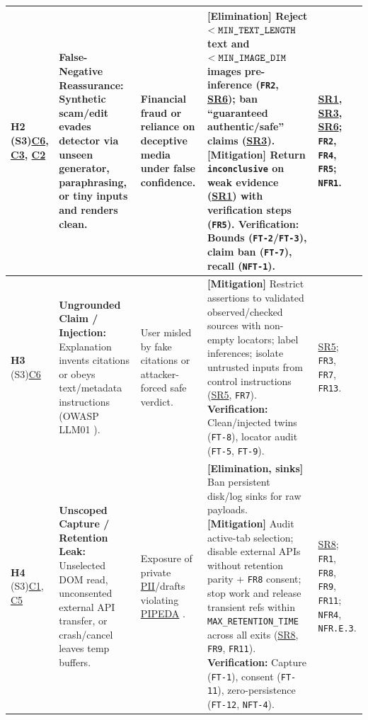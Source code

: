 \documentclass[11pt]{article}
\newcommand{\MaxRetentionTime}{\texttt{MAX\_\allowbreak{}RETENTION\_\allowbreak{}TIME}}
\newcommand{\MinTextLength}{\texttt{MIN\_\allowbreak{}TEXT\_\allowbreak{}LENGTH}}
\newcommand{\MinImageDim}{\texttt{MIN\_\allowbreak{}IMAGE\_\allowbreak{}DIM}}
\newcommand{\PII}{\hyperlink{ha-acr-pii}{PII}}
\newcommand{\PIPEDA}{\hyperlink{ha-acr-pipeda}{PIPEDA}}
\begin{document}
\begin{landscape}
\begin{tabularx}{\linewidth}{P{1.75cm} P{3.2cm} P{2.9cm} Y P{2.25cm}}
\label{haz:H2}\textbf{H2} (S3)\newline \hyperref[comp:C6]{C6}, \hyperref[comp:C3]{C3}, \hyperref[comp:C2]{C2} &
\textbf{False-Negative Reassurance:} Synthetic scam/edit evades detector via unseen generator, paraphrasing, or tiny inputs and renders clean. &
Financial fraud or reliance on deceptive media under false confidence. &
\textbf{[Elimination]} Reject $< \MinTextLength{}$ text and $< \MinImageDim{}$ images pre-inference (\texttt{FR2}, \hyperref[SR6]{SR6}); ban ``guaranteed authentic/safe'' claims (\hyperref[SR3]{SR3}).\newline
\textbf{[Mitigation]} Return \texttt{inconclusive} on weak evidence (\hyperref[SR1]{SR1}) with verification steps (\texttt{FR5}).\newline
\textbf{Verification:} Bounds (\texttt{FT-2}/\texttt{FT-3}), claim ban (\texttt{FT-7}), recall (\texttt{NFT-1}). &
\hyperref[SR1]{SR1}, \hyperref[SR3]{SR3}, \hyperref[SR6]{SR6}; \texttt{FR2}, \texttt{FR4}, \texttt{FR5}; \texttt{NFR1}.\\
\midrule

\label{haz:H3}\textbf{H3} (S3)\newline \hyperref[comp:C6]{C6} &
\textbf{Ungrounded Claim / Injection:} Explanation invents citations or obeys text/metadata instructions (OWASP LLM01 \cite{OWASPLLM}). &
User misled by fake citations or attacker-forced safe verdict. &
\textbf{[Mitigation]} Restrict assertions to validated observed/checked sources with non-empty locators; label inferences; isolate untrusted inputs from control instructions (\hyperref[SR5]{SR5}, \texttt{FR7}).\newline
\textbf{Verification:} Clean/injected twins (\texttt{FT-8}), locator audit (\texttt{FT-5}, \texttt{FT-9}). &
\hyperref[SR5]{SR5}; \texttt{FR3}, \texttt{FR7}, \texttt{FR13}.\\
\midrule

\label{haz:H4}\textbf{H4} (S3)\newline \hyperref[comp:C1]{C1}, \hyperref[comp:C5]{C5} &
\textbf{Unscoped Capture / Retention Leak:} Unselected DOM read, unconsented external API transfer, or crash/cancel leaves temp buffers. &
Exposure of private \PII{}/drafts violating \PIPEDA{} \cite{PIPEDA}. &
\textbf{[Elimination, sinks]} Ban persistent disk/log sinks for raw payloads.\newline
\textbf{[Mitigation]} Audit active-tab selection; disable external APIs without retention parity + \texttt{FR8} consent; stop work and release transient refs within \MaxRetentionTime{} across all exits (\hyperref[SR8]{SR8}, \texttt{FR9}, \texttt{FR11}).\newline
\textbf{Verification:} Capture (\texttt{FT-1}), consent (\texttt{FT-11}), zero-persistence (\texttt{FT-12}, \texttt{NFT-4}). &
\hyperref[SR8]{SR8}; \texttt{FR1}, \texttt{FR8}, \texttt{FR9}, \texttt{FR11}; \texttt{NFR4}, \texttt{NFR.E.3}.\\
\midrule


\end{tabularx}
\end{landscape}
\end{document}
